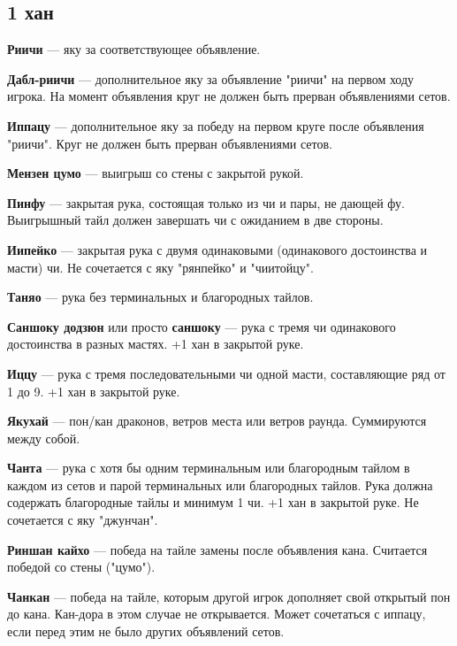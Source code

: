 \subsection{1 хан}

\textbf{Риичи} --- яку за соответствующее объявление.

\textbf{Дабл-риичи} --- дополнительное яку за объявление "риичи" на первом ходу игрока. На момент объявления круг не должен быть прерван объявлениями сетов.

\textbf{Иппацу} --- дополнительное яку за победу на первом круге после объявления "риичи". Круг не должен быть прерван объявлениями сетов.

\textbf{Мензен цумо} --- выигрыш со стены с закрытой рукой.

\textbf{Пинфу} --- закрытая рука, состоящая только из чи и пары, не дающей фу. Выигрышный тайл должен завершать чи с ожиданием в две стороны.

\textbf{Иипейко} --- закрытая рука с двумя одинаковыми (одинакового достоинства и масти) чи. Не сочетается с яку "рянпейко" и "чиитойцу".


\textbf{Таняо} --- рука без терминальных и благородных тайлов.

\textbf{Саншоку додзюн} или просто \textbf{саншоку} --- рука с тремя чи одинакового достоинства в разных мастях. +1 хан в закрытой руке.


\textbf{Иццу} --- рука с тремя последовательными чи одной масти, составляющие ряд от 1 до 9. +1 хан в закрытой руке.


\textbf{Якухай} --- пон/кан драконов, ветров места или ветров раунда. Суммируются между собой.

\textbf{Чанта} --- рука с хотя бы одним терминальным или благородным тайлом в каждом из сетов и парой терминальных или благородных тайлов. Рука должна содержать благородные тайлы и минимум 1 чи. +1 хан в закрытой руке. Не сочетается с яку "джунчан".

\textbf{Риншан кайхо} --- победа на тайле замены после объявления кана. Считается победой со стены ("цумо").

\textbf{Чанкан} --- победа на тайле, которым другой игрок дополняет свой открытый пон до кана. Кан-дора в этом случае не открывается. Может сочетаться с иппацу, если перед этим не было других объявлений сетов.

